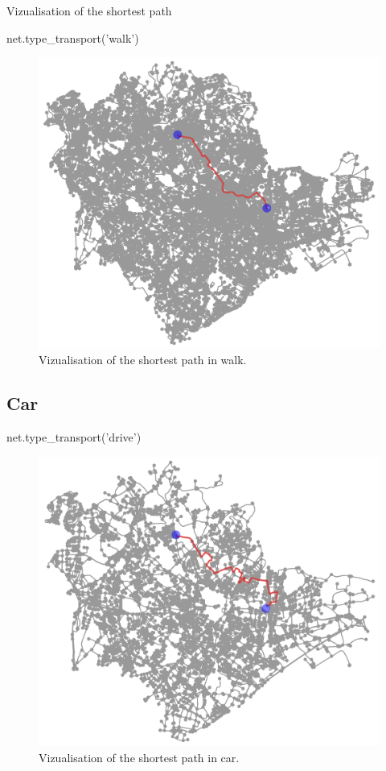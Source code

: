 \documentclass[11pt, compress]{beamer}
\theoremstyle{definition}
\begin{document}
\begin{frame}{Vizualisation of the shortest path}
\begin{block}{}
net.type\_transport('walk')
\end{block}
\begin{figure}[H]
    \centering
    \includegraphics[scale=.45]{walk.png}
    \caption{Vizualisation of the shortest path in walk.}
    \label{fig:walk}
\end{figure}
\end{frame}

\subsection{Car}
\begin{frame}{}
    \begin{block}{}
net.type\_transport('drive')
\end{block}
\begin{figure}[H]
    \centering
    \includegraphics[scale=.45]{drive.png}
    \caption{Vizualisation of the shortest path in car.}
    \label{fig:car}
\end{figure}
\end{frame}
\end{document}
